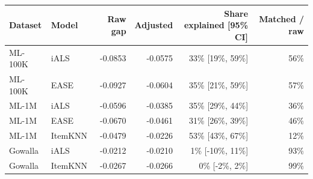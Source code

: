 \begin{tabular}{llrrrr}
\toprule
Dataset & Model & Raw gap & Adjusted & Share explained [95\% CI] & Matched / raw \\
\midrule
ML-100K & iALS & -0.0853 & -0.0575 & 33\% [19\%, 59\%] & 56\% \\
ML-100K & EASE & -0.0927 & -0.0604 & 35\% [21\%, 59\%] & 57\% \\
ML-1M & iALS & -0.0596 & -0.0385 & 35\% [29\%, 44\%] & 36\% \\
ML-1M & EASE & -0.0670 & -0.0461 & 31\% [26\%, 39\%] & 46\% \\
ML-1M & ItemKNN & -0.0479 & -0.0226 & 53\% [43\%, 67\%] & 12\% \\
Gowalla & iALS & -0.0212 & -0.0210 & 1\% [-10\%, 11\%] & 93\% \\
Gowalla & ItemKNN & -0.0267 & -0.0266 & 0\% [-2\%, 2\%] & 99\% \\
\bottomrule
\end{tabular}
